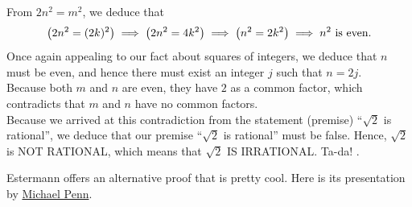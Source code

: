 From $2 n^2 = m^2$, we deduce that 
$$ \left(2 n^2 = (2 k)^2 \right) \implies \left(2 n^2 = 4 k^2 \right) \implies \left( n^2 = 2 k^2 \right)  \implies n^2  \textnormal{ is even}.$$
Once again appealing to our fact about squares of integers, we deduce that $n$ must be even, and hence there must exist an integer $j$ such that $n=2 j$.\\

Because both $m$ and $n$ are even, they have $2$ as a common factor, which contradicts that $m$ and $n$ have no common factors. \\

Because we arrived at this contradiction from the statement (premise) ``$\sqrt{2}$ is rational'', we deduce that our premise ``$\sqrt{2}$ is rational'' must be false. Hence, $\sqrt{2}$ is NOT RATIONAL, which means that $\sqrt{2}$ IS IRRATIONAL. Ta-da! 
\Qed.

\bigskip

\begin{rem} Estermann offers an alternative proof that is pretty cool. Here is its presentation by \href{https://www.youtube.com/shorts/jc09ETJx2jA?feature=share}{Michael Penn}. 


\end{rem}

\bigskip

